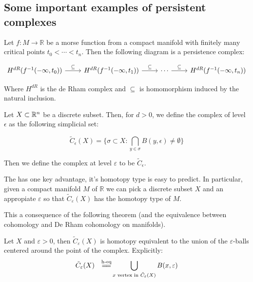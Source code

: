 \subsection{Some important examples of persistent complexes}
\label{examplespersistence}

\begin{definition}
Let $f:M\to\mathbb{R}$ be a morse function from a compact manifold 
with finitely many critical points $t_0<\cdots<t_n$. Then the following diagram
is a persistence complex:

$$
\begin{tikzcd}
H^{dR}(f^{-1}(-\infty,t_0)) \arrow[r,"\subseteq"]
& H^{dR}(f^{-1}(-\infty,t_1)) \arrow[r,"\subseteq"]
& \cdots\arrow[r,"\subseteq"]
& H^{dR}(f^{-1}(-\infty,t_n))
\end{tikzcd}
$$

Where $H^{dR}$ is the de Rham complex and $\subseteq$
is homomorphism induced by the natural inclusion.

\end{definition}

\begin{definition}

Let $X\subset \mathbb{R}^n$ be a discrete subset. Then, for $d>0$, we define the {\Cech}
complex of level $\epsilon$ as the following simplicial set:


$$
\tilde{C}_\epsilon(X)
=
\{
\sigma \subset X :
\bigcap_{y\in\sigma} B(y,\epsilon)\neq \emptyset
\}
$$

Then we define the {\Cech} complex at level $\varepsilon$ to be $\tilde{C}_\epsilon$.

\end{definition}


The {\Cech} has one key advantage,
it's homotopy type is easy to predict.
In particular, given a compact manifold $M$ of $\mathbb{R}$
we can pick a discrete subset $X$ and an appropiate $\varepsilon$
so that $\tilde C_\varepsilon(X)$ has the homotopy type of $M$.

This a consequence of the following theorem (and 
the equivalence between {\Cech} cohomology and De Rham
cohomology on manifolds).

\begin{theorem}
Let $X$ and $\varepsilon>0$, then $\tilde C_\varepsilon(X)$
is homotopy equivalent to the union of the $\varepsilon$-balls centered 
around the point of the complex. Explicitly:
$$
\tilde C_\varepsilon(X)
\quad
\overset{\text{h-eq}}
{{
=
\joinrel=
}}
\displaystyle\bigcup_{x \text{
vertex in 
}
\tilde C_\varepsilon(X)
}
B(x,\varepsilon)
$$
\end{theorem}


